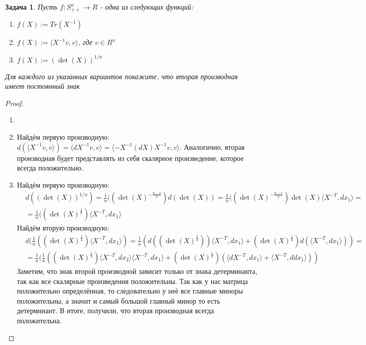 \documentclass[a4paper]{article}
\newtheorem{problem}{Задача}
\begin{document}
\begin{problem} Пусть $f : S^n_{++} \rightarrow R$ - одна из следующих функций:
    \begin{enumerate}[label=(\alph*)]
        \item $f(X) := Tr(X^{-1})$
        \item $f(X) := \langle X^{-1} v, v\rangle$, где $v \in R^n$
        \item $f(X) := (\det(X))^{1/n}$
    \end{enumerate}
Для каждого из указанных вариантов покажите, что вторая производная имеет постоянный знак
\end{problem}
\begin{proof}
    \begin{enumerate}[label=(\alph*)]
        \item
        \item Найдём первую производную:  $d(\langle X^{-1} v, v\rangle) = \langle d X^{-1} v, v\rangle = \langle -X^{-1}(d X)X^{-1} v, v\rangle$. Аналогично, вторая производная будет представлять из себя скалярное произведение, которое всегда положительно.
        \item Найдём первую производную: 
        \begin{align*}
        &d((\det(X))^{1/n}) = \frac{1}{n}((\det(X)^{-\frac{n-1}{n}})d(\det(X)) = \frac{1}{n}((\det(X)^{-\frac{n-1}{n}})\det(X)\langle X^{-T}, d x_1 \rangle = \\ & = \frac{1}{{n}}((\det(X)^{\frac{1}{n}})\langle X^{-T}, d x_1 \rangle
        \end{align*}
        Найдём вторую производную:
        \begin{align*}
        &d(\frac{1}{n}((\det(X)^{\frac{1}{n}})\langle X^{-T}, d x_1 \rangle) = \frac{1}{n}(d((\det(X)^{\frac{1}{n}})) \langle X^{-T}, d x_1 \rangle + (\det(X)^{\frac{1}{n}})d(\langle X^{-T}, d x_1 \rangle)) = \\ &= \frac{1}{n}(\frac{1}{{n}}((\det(X)^{\frac{1}{n}})\langle X^{-T}, d x_2 \rangle \langle X^{-T}, d x_1 \rangle + (\det(X)^{\frac{1}{n}})(\langle d X^{-T}, d x_1 \rangle + \langle X^{-T}, d d x_1 \rangle))
        \end{align*}
        Заметим, что знак второй производной зависит только от знака детерминанта, так как все скалярные произведения положительны. Так как у нас матрица положительно определённая, то следовательно у неё все главные миноры положительны, а значит и самый большой главный минор то есть детерминант. В итоге, получили, что вторая производная всегда положительна.
\end{enumerate}
\end{proof}
\end{document}
